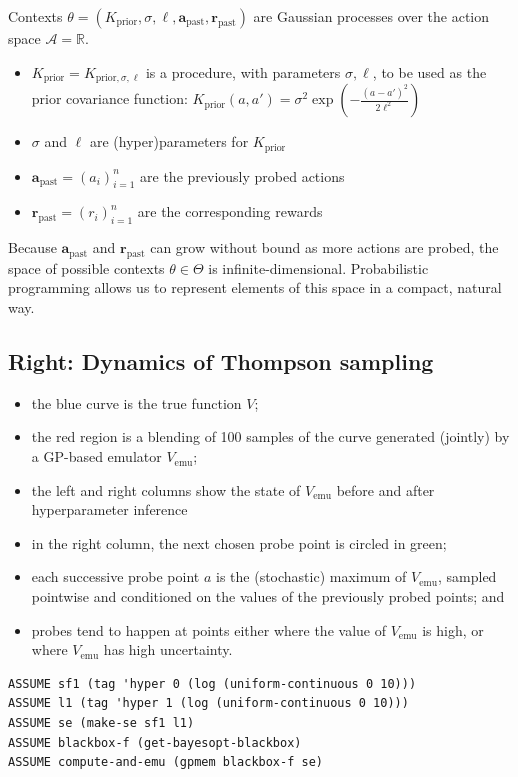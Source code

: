 \documentclass[a0,portrait]{a0poster}
\newcommand{\emu}{{\textrm{emu}}}
\newcommand{\past}{{\textrm{past}}}
\newcommand{\prior}{{\textrm{prior}}}
\newcommand{\Acal}{\mathcal{A}}
\newcommand{\R}{\mathbb{R}}
\newcommand{\abf}{\mathbf{a}}
\newcommand{\rbf}{\mathbf{r}}
\newcommand{\pn}[1]{\left( #1 \right)}
\begin{document}
\begin{multicols}{2}
Contexts $\theta = (K_\prior, \sigma, \ell, \abf_\past, \rbf_\past)$ are Gaussian processes over the action space $\Acal = \R$.
\begin{itemize}
  \item $K_\prior = K_{\prior,\sigma,\ell}$ is a procedure, with parameters $\sigma,\ell$, to be used as the prior covariance function: $K_\prior(a,a') = \sigma^2 \exp\pn{-\frac{(a-a')^2}{2\ell^2}}$
  \item $\sigma$ and $\ell$ are (hyper)parameters for $K_\prior$
  \item $\abf_\past = \pn{a_i}_{i=1}^{n}$ are the previously probed actions
  \item $\rbf_\past = \pn{r_i}_{i=1}^{n}$ are the corresponding rewards
\end{itemize}
Because $\abf_\past$ and $\rbf_\past$ can grow without bound as more actions are probed, the space of possible contexts $\theta \in \Theta$ is infinite-dimensional.  Probabilistic programming allows us to represent elements of this space in a compact, natural way.

\subsection*{Right: Dynamics of Thompson sampling}
\begin{itemize}
 \item the blue curve is the true function $V$;
 \item the red region is a blending of 100 samples of the curve generated (jointly) by a GP-based emulator $V_\emu$;
 \item  the left and right columns show the state of $V_\emu$ before and after hyperparameter inference
 \item in the right column, the next chosen probe point is circled in green;
 \item each successive probe point $a$ is the (stochastic) maximum of $V_\emu$, sampled pointwise and conditioned on the values of the previously probed points; and
 \item probes tend to happen at points either where the value of $V_\emu$ is high, or where $V_\emu$ has high uncertainty.
\end{itemize}

\begin{minipage}{38cm}
\begin{lstlisting}[frame=single,label=alg:structureVent,caption=Venture Code for Bayesian Optimization,mathescape]
ASSUME sf1 (tag 'hyper 0 (log (uniform-continuous 0 10)))
ASSUME l1 (tag 'hyper 1 (log (uniform-continuous 0 10)))
ASSUME se (make-se sf1 l1)
ASSUME blackbox-f (get-bayesopt-blackbox)
ASSUME compute-and-emu (gpmem blackbox-f se)


\end{lstlisting}
\end{minipage}
\end{multicols}
\end{document}
